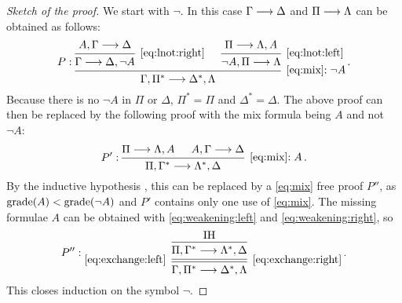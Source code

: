 \documentclass[11pt,a4paper]{article}
\begin{document}
\begin{proof}[Sketch of the proof]
    We start with \(\lnot\). In this case \(\Gamma\longrightarrow\Delta\) and \(\Pi\longrightarrow\Lambda\)
    can be obtained as follows:
    \begin{equation*}
        P:
        \begin{prooftree}
            \hypo{A,\Gamma\seq\Delta}
            \infer1[\eqref{eq:lnot:right}]{\Gamma\seq\Delta,\lnot A}
            \hypo{\Pi\seq\Lambda,A}
            \infer1[\eqref{eq:lnot:left}]{\lnot A,\Pi\seq\Lambda}
            \infer2[\eqref{eq:mix}\(:\lnot A\)]{\Gamma,\Pi^*\seq\Delta^*,\Lambda}
        \end{prooftree}\,.
    \end{equation*}
    Because there is no \(\lnot A\) in \(\Pi\) or \(\Delta\),
    \(\Pi^* = \Pi\) and \(\Delta^*=\Delta\).
    The above proof can then be replaced by the following proof
    with the mix formula being \(A\) and not \(\lnot A\):
    \begin{equation*}
        P':
        \begin{prooftree}
            \hypo{\Pi\seq\Lambda,A}
            \hypo{A,\Gamma\seq\Delta}
            \infer2[\eqref{eq:mix}\(:A\)]{\Pi,\Gamma^*\seq\Lambda^*,\Delta}
        \end{prooftree}\,.
    \end{equation*}
    By the inductive hypothesis \IH{}, this can be replaced by a \eqref{eq:mix} free proof \(P''\),
    as \(\operatorname{grade}(A) < \operatorname{grade}(\lnot A)\) and \(P'\) contains only one use of \eqref{eq:mix}.
    The missing formulae \(A\) can be obtained with \eqref{eq:weakening:left}
    and \eqref{eq:weakening:right}, so
    \begin{equation*}
        P'':
        \begin{prooftree}
            \hypo{\IH}
            \infer1{\Pi,\Gamma^*\seq\Lambda^*,\Delta}
            \infer[double,left label=\eqref{eq:exchange:left}]1[\eqref{eq:exchange:right}]{\Gamma,\Pi^*\seq\Delta^*,\Lambda}
        \end{prooftree}\,.
    \end{equation*}
    This closes induction on the symbol \(\lnot\).


\end{proof}
\end{document}
